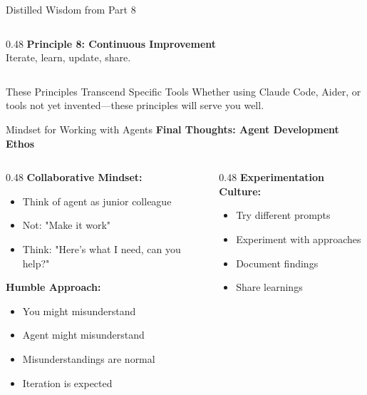 \documentclass[aspectratio=169,11pt]{beamer}
\begin{document}
\begin{frame}{Distilled Wisdom from Part 8}
\begin{columns}[T]
\begin{column}{0.48\textwidth}
            \vspace{0.2cm}
            \textbf{Principle 8: Continuous Improvement}\\
            Iterate, learn, update, share.
        \end{column}
    \end{columns}

    \vspace{0.4cm}
    \begin{block}{These Principles Transcend Specific Tools}
        Whether using Claude Code, Aider, or tools not yet invented---these principles will serve you well.
    \end{block}
\end{frame}

\begin{frame}{Mindset for Working with Agents}
    \textbf{Final Thoughts: Agent Development Ethos}

    \begin{columns}[T]
        \begin{column}{0.48\textwidth}
            \textbf{Collaborative Mindset:}
            \begin{itemize}
                \item Think of agent as junior colleague
                \item Not: "Make it work"
                \item Think: "Here's what I need, can you help?"
            \end{itemize}

            \vspace{0.3cm}
            \textbf{Humble Approach:}
            \begin{itemize}
                \item You might misunderstand
                \item Agent might misunderstand
                \item Misunderstandings are normal
                \item Iteration is expected
            \end{itemize}
        \end{column}
        \begin{column}{0.48\textwidth}
            \textbf{Experimentation Culture:}
            \begin{itemize}
                \item Try different prompts
                \item Experiment with approaches
                \item Document findings
                \item Share learnings
            \end{itemize}


\end{column}
\end{columns}
\end{frame}
\end{document}
